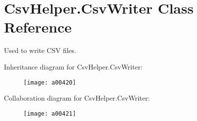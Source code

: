 \hypertarget{a00080}{\section{Csv\-Helper.\-Csv\-Writer Class Reference}
\label{a00080}
}


Used to write C\-S\-V files.  




Inheritance diagram for Csv\-Helper.\-Csv\-Writer\-:
\nopagebreak
\begin{figure}[H]
\begin{center}
\leavevmode
\texttt{[image: a00420]}
\end{center}
\end{figure}


Collaboration diagram for Csv\-Helper.\-Csv\-Writer\-:
\nopagebreak
\begin{figure}[H]
\begin{center}
\leavevmode
\texttt{[image: a00421]}
\end{center}
\end{figure}
